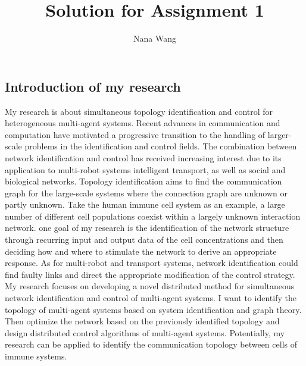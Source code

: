 \documentclass[11pt]{article}
\title{Solution for Assignment 1}
\author{Nana Wang}
\begin{document}
\maketitle

                                                                      
\subsection*{Introduction of my research}
My research is about simultaneous topology identification and control for heterogeneous multi-agent systems. Recent advances in communication and computation have motivated a progressive transition to the handling of larger-scale problems in the identification and control fields.  
The combination between network identification and control has received increasing interest due to its application to multi-robot systems intelligent transport, as well as social and biological networks. Topology identification aims to find the communication graph for the large-scale systems where the connection graph are unknown or partly unknown. Take the human immune cell system as an example, a large number of different cell populations coexist within a largely unknown interaction network. one goal of my research is the identification of the network structure through recurring input and output data of the cell concentrations and then deciding how and where to stimulate the network to derive an appropriate response. As for multi-robot and transport systems, network identification could find faulty links and direct the appropriate modification of the control strategy. My research focuses on developing a novel distributed method for simultaneous network identification and control of multi-agent systems. I want to identify the topology of multi-agent systems based on system identification and graph theory. Then optimize the network based on the previously identified topology and design distributed control algorithms of multi-agent systems. Potentially, my research can be applied to identify the communication topology between cells of immune systems.
\\
\end{document}
